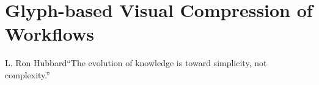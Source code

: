 






\chapter{Glyph-based Visual Compression of Workflows}
\label{chap:automacron}

\begin{chapquote}{L. Ron Hubbard}{``The evolution of knowledge is toward simplicity, not complexity.''}
\end{chapquote}



